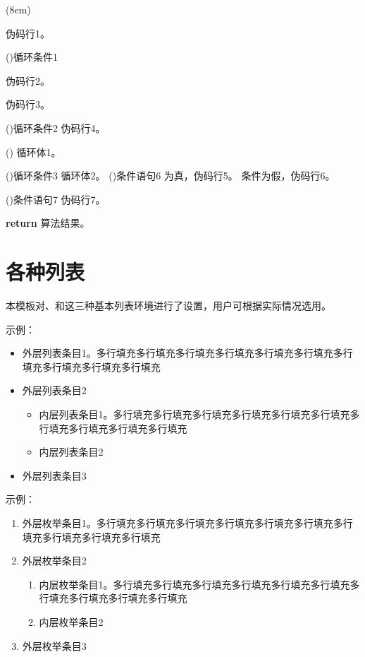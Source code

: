 \documentclass[doctor, vlined, ]{DissertUESTC}
\begin{document}
	\begin{algo}[!h](8em)
		\renewcommand{\algorithmcfname}{过程}  %
		\caption{algo环境临时修改伪码标签并调整宽度示例} \label{alg: algo环境修改伪码标签并调整宽度示例}
		伪码行1。
		
		\For(){循环条件1}{
			伪码行2。
			
			伪码行3。
			
			\DoWhile(){循环条件2}{
				伪码行4。
			}
			
			\Loop(){
				循环体1。
			}
			
			\Repeat(){循环条件3}{
				循环体2。
			}
			\eIf(){条件语句6}{
				为真，伪码行5。
			}{
				条件为假，伪码行6。
			}
			
			\If(){条件语句7}{
				伪码行7。
			}
		}
		\textbf{return} 算法结果。
	\end{algo}

	\clearpage
	\section{各种列表}

	本模板对、和这三种基本列表环境进行了设置，用户可根据实际情况选用。

	示例：

	\begin{itemize}
		\item 外层列表条目1。多行填充多行填充多行填充多行填充多行填充多行填充多行填充多行填充多行填充多行填充
		\item 外层列表条目2
		\begin{itemize}
			\item 内层列表条目1。多行填充多行填充多行填充多行填充多行填充多行填充多行填充多行填充多行填充多行填充
			\item 内层列表条目2
		\end{itemize}
		\item 外层列表条目3
	\end{itemize}

	\null

	示例：

	\begin{enumerate}
		\item 外层枚举条目1。多行填充多行填充多行填充多行填充多行填充多行填充多行填充多行填充多行填充多行填充
		\item 外层枚举条目2
		\begin{enumerate}
			\item 内层枚举条目1。多行填充多行填充多行填充多行填充多行填充多行填充多行填充多行填充多行填充多行填充
			\item 内层枚举条目2
		\end{enumerate}
		\item 外层枚举条目3
	\end{enumerate}
\end{document}
